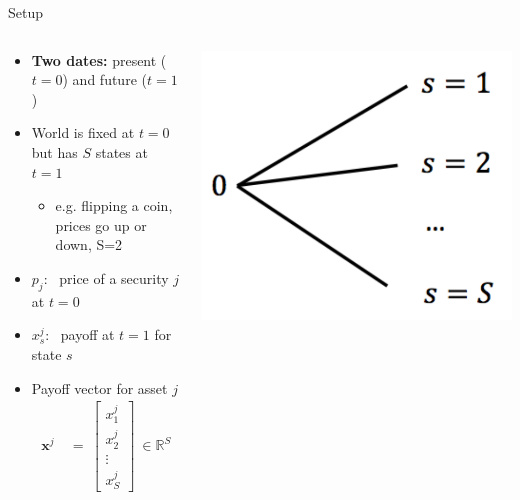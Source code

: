 \documentclass[aspectratio=1610]{beamer}
\newcommand{\eq}{\ =\ }
\newcommand{\bb}{\mathbb}
\begin{document}
\begin{frame}{Setup}

\begin{columns}
\begin{column}{0.6\textwidth}
  \begin{itemize}
    \item {\bf Two dates:} present ($t=0$) and future ($t=1$)
    \item World is fixed at $t=0$ but has $S$ states at $t=1$
    \begin{itemize}
      \item e.g. flipping a coin, prices go up or down, S=2
    \end{itemize}
    \vspace{1ex}

    \item $p_j$: \ price of a security $j$ at $t=0$
    \item $x^j_s$: \ payoff at $t=1$ for state $s$
    \vspace{2ex}

    \item Payoff vector for asset $j$
    \begin{align*}
      \bm x^j & \eq
      \begin{bmatrix}
        x^j_1 \\
        x^j_2 \\
        \vdots \\
        x^j_S
      \end{bmatrix}
      \ \in \bb R^S
    \end{align*}

  \end{itemize}
\end{column}
\begin{column}{0.38\textwidth} \centering
  \includegraphics[width=.85\textwidth]{images/one-period.PNG}
\end{column}
\end{columns}
\end{frame}
\end{document}
